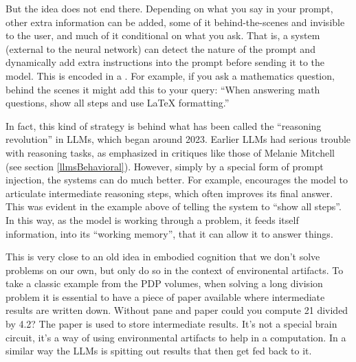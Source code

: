 But the idea does not end there. Depending on what you say in your prompt,
other extra information can be added, some of it behind-the-scenes and
invisible to the user, and much of it conditional on what you ask. That is, a
system (external to the neural network) can detect the nature of the prompt and
dynamically add extra instructions into the prompt before sending it to the
model. This is encoded in a . For example, if you
ask a mathematics question, behind the scenes it might add this to your query:
``When answering math questions, show all steps and use LaTeX formatting.''

In fact, this kind of strategy is behind what has been called the ``reasoning
revolution'' in LLMs, which began around 2023. Earlier LLMs had serious trouble
with reasoning tasks, as emphasized in critiques like those of Melanie Mitchell
(see section \ref{llmsBehavioral}). However, simply by a special form of prompt
injection, the systems can do much better.  For example,  encourages the model to articulate intermediate reasoning steps, which
often improves its final answer. This was evident in the example above of
telling the system to ``show all steps''. In this way, as the model is working
through a problem, it feeds itself information, into its ``working memory'',
that it can allow it to answer things.

This is very close to an old idea in embodied cognition that we don't solve
problems on our own, but only do so in the context of environental artifacts.
To take a classic example from the PDP volumes, when solving a long division
problem it is essential to have a piece of paper available where intermediate
results are written down. Without pane and paper could you compute 21 divided
by 4.2? The paper is used to store intermediate results. It's not a special
brain circuit, it's a way of using environmental artifacts to help in a
computation. In a similar way the LLMs is spitting out results that then get
fed back to it.

